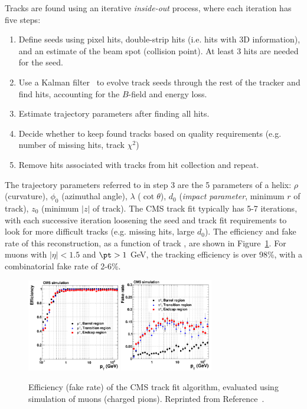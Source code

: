 Tracks are found using an iterative \emph{inside-out} process, where each iteration has five steps:
\begin{enumerate}
    \item Define seeds using pixel hits, double-strip hits (i.e. hits with 3D information), and an estimate of the beam spot (collision point). At least 3 hits are needed for the seed.
    \item Use a Kalman filter~\cite{kalman2,kalman1} to evolve track seeds through the rest of the tracker and find hits, accounting for the $B$-field and energy loss.
    \item Estimate trajectory parameters after finding all hits.
    \item Decide whether to keep found tracks based on quality requirements (e.g. number of missing hits, track $\chi^2$)
    \item Remove hits associated with tracks from hit collection and repeat.
\end{enumerate}
The trajectory parameters referred to in step 3 are the 5 parameters of a helix: $\rho$ (curvature), $\phi_0$ (azimuthal angle), $\lambda$ ($\cot\theta$), $d_0$ (\emph{impact parameter}, minimum $r$ of track), $z_0$ (minimum $|z|$ of track).
The CMS track fit typically has 5-7 iterations, with each successive iteration loosening the seed and track fit requirements to look for more difficult tracks (e.g. missing hits, large $d_0$).
The efficiency and fake rate of this reconstruction, as a function of track \pt, are shown in Figure~\ref{fig:cms:trackeff}.
For muons with $|\eta|<1.5$ and $\pt>1$ GeV, the tracking efficiency is over 98\%, with a combinatorial fake rate of 2-6\%. 

\begin{figure}[]
    \begin{center} 
        \includegraphics[width=0.36\textwidth]{figures/cms/track_eff.png}
        \includegraphics[width=0.36\textwidth]{figures/cms/track_fake.png}
        \caption{Efficiency (fake rate) of the CMS track fit algorithm, evaluated using simulation of muons (charged pions).
                 Reprinted from Reference~\cite{cmstracker}.}
        \label{fig:cms:trackeff}
    \end{center}
\end{figure}

